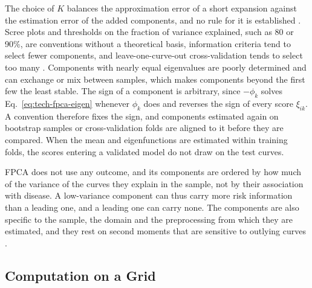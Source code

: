 The choice of $K$ balances the approximation error of a short expansion against the estimation error of the added components, and no rule for it is established \cite{wang2016fda}.
Scree plots and thresholds on the fraction of variance explained, such as 80 or 90\%, are conventions without a theoretical basis, information criteria tend to select fewer components, and leave-one-curve-out cross-validation tends to select too many \cite{wang2016fda}.
Components with nearly equal eigenvalues are poorly determined and can exchange or mix between samples, which makes components beyond the first few the least stable.
The sign of a component is arbitrary, since $-\phi_k$ solves Eq.~\eqref{eq:tech-fpca-eigen} whenever $\phi_k$ does and reverses the sign of every score $\xi_{ik}$.
A convention therefore fixes the sign, and components estimated again on bootstrap samples or cross-validation folds are aligned to it before they are compared.
When the mean and eigenfunctions are estimated within training folds, the scores entering a validated model do not draw on the test curves.

FPCA does not use any outcome, and its components are ordered by how much of the variance of the curves they explain in the sample, not by their association with disease.
A low-variance component can thus carry more risk information than a leading one, and a leading one can carry none.
The components are also specific to the sample, the domain and the preprocessing from which they are estimated, and they rest on second moments that are sensitive to outlying curves \cite{wang2016fda}.

\subsection{Computation on a Grid}
\label{sec:tech-fpca-grid}

